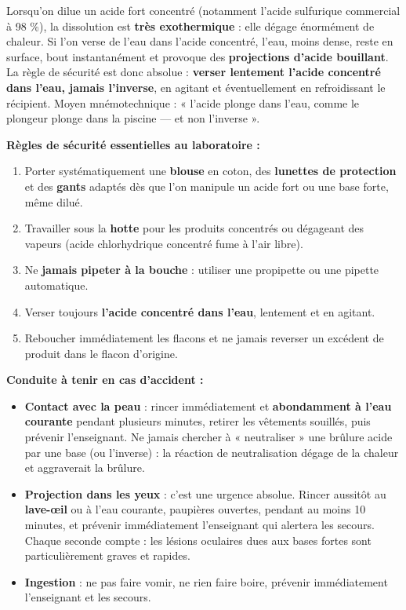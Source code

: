 \documentclass[11pt]{article}
\begin{document}
\begin{attention}
Lorsqu'on dilue un acide fort concentré (notamment l'acide sulfurique commercial à 98 \%), la dissolution est \textbf{très exothermique} : elle dégage énormément de chaleur. Si l'on verse de l'eau dans l'acide concentré, l'eau, moins dense, reste en surface, bout instantanément et provoque des \textbf{projections d'acide bouillant}. La règle de sécurité est donc absolue : \textbf{verser lentement l'acide concentré dans l'eau, jamais l'inverse}, en agitant et éventuellement en refroidissant le récipient. Moyen mnémotechnique : « l'acide plonge dans l'eau, comme le plongeur plonge dans la piscine — et non l'inverse ».
\end{attention}

\textbf{Règles de sécurité essentielles au laboratoire :}
\begin{enumerate}
\item Porter systématiquement une \textbf{blouse} en coton, des \textbf{lunettes de protection} et des \textbf{gants} adaptés dès que l'on manipule un acide fort ou une base forte, même dilué.
\item Travailler sous la \textbf{hotte} pour les produits concentrés ou dégageant des vapeurs (acide chlorhydrique concentré fume à l'air libre).
\item Ne \textbf{jamais pipeter à la bouche} : utiliser une propipette ou une pipette automatique.
\item Verser toujours \textbf{l'acide concentré dans l'eau}, lentement et en agitant.
\item Reboucher immédiatement les flacons et ne jamais reverser un excédent de produit dans le flacon d'origine.
\end{enumerate}

\textbf{Conduite à tenir en cas d'accident :}
\begin{itemize}
\item \textbf{Contact avec la peau} : rincer immédiatement et \textbf{abondamment à l'eau courante} pendant plusieurs minutes, retirer les vêtements souillés, puis prévenir l'enseignant. Ne jamais chercher à « neutraliser » une brûlure acide par une base (ou l'inverse) : la réaction de neutralisation dégage de la chaleur et aggraverait la brûlure.
\item \textbf{Projection dans les yeux} : c'est une urgence absolue. Rincer aussitôt au \textbf{lave-œil} ou à l'eau courante, paupières ouvertes, pendant au moins 10 minutes, et prévenir immédiatement l'enseignant qui alertera les secours. Chaque seconde compte : les lésions oculaires dues aux bases fortes sont particulièrement graves et rapides.
\item \textbf{Ingestion} : ne pas faire vomir, ne rien faire boire, prévenir immédiatement l'enseignant et les secours.
\end{itemize}
\end{document}
